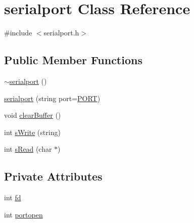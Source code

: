 \hypertarget{classserialport}{\section{serialport Class Reference}
\label{classserialport}
}


{\ttfamily \#include $<$serialport.\-h$>$}

\subsection*{Public Member Functions}
\begin{DoxyCompactItemize}
\item 
\hyperlink{classserialport_ab6548ae7a7dcdb343e838140c8dfac9e}{$\sim$serialport} ()
\item 
\hyperlink{classserialport_a13b9a65e668dfd43f059c4e7b0e338fa}{serialport} (string port=\hyperlink{serialport_8h_a614217d263be1fb1a5f76e2ff7be19a2}{P\-O\-R\-T})
\item 
void \hyperlink{classserialport_ae2b84921379b9b43f2f8533c1374f443}{clear\-Buffer} ()
\item 
int \hyperlink{classserialport_ad2ef385508f2b121b90113c0b52b9b12}{s\-Write} (string)
\item 
int \hyperlink{classserialport_a5b840874cc3c361824051428f05a2d1c}{s\-Read} (char $\ast$)
\end{DoxyCompactItemize}
\subsection*{Private Attributes}
\begin{DoxyCompactItemize}
\item 
int \hyperlink{classserialport_ac0f432659cd8e2a2a05a7d8583d73968}{fd}
\item 
int \hyperlink{classserialport_ac2fa330c6a6d254fcda6e327eac6a7e7}{portopen}
\end{DoxyCompactItemize}


